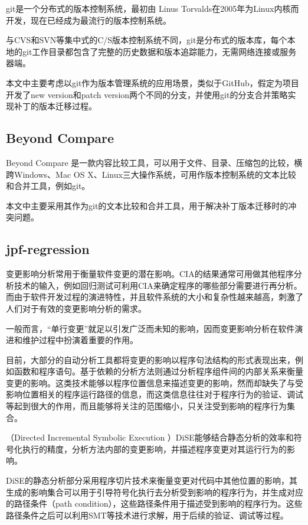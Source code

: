 git是一个分布式的版本控制系统，最初由 Linus Torvalds在2005年为Linux内核而开发，现在已经成为最流行的版本控制系统。

与CVS和SVN等集中式的C/S版本控制系统不同，git是分布式的版本库，每个本地的git工作目录都包含了完整的历史数据和版本追踪能力，无需网络连接或服务器端。
      

本文中主要考虑以git作为版本管理系统的应用场景，类似于GitHub，假定为项目开发了new version和patch version两个不同的分支，并使用git的分支合并策略实现补丁的版本迁移过程。
	\subsection{Beyond Compare}
		
Beyond Compare 是一款内容比较工具，可以用于文件、目录、压缩包的比较，横跨Windows、Mac OS X、Linux三大操作系统，可用作版本控制系统的文本比较和合并工具，例如git。
      
本文中主要采用其作为git的文本比较和合并工具，用于解决补丁版本迁移时的冲突问题。


	\subsection{jpf-regression} 
变更影响分析常用于衡量软件变更的潜在影响。CIA的结果通常可用做其他程序分析技术的输入，例如回归测试可利用CIA来确定程序的哪些部分需要进行再分析。而由于软件开发过程的演进特性，并且软件系统的大小和复杂性越来越高，刺激了人们对于有效的变更影响分析的需求。\cite{rungta2012change}

一般而言，“单行变更”就足以引发广泛而未知的影响，因而变更影响分析在软件演进和维护过程中扮演着重要的作用。

目前，大部分的自动分析工具都将变更的影响以程序句法结构的形式表现出来，例如函数和程序语句。基于依赖的分析方法则通过分析程序组件间的内部关系来衡量变更的影响。这类技术能够以程序位置信息来描述变更的影响，然而却缺失了与受影响位置相关的程序运行路径的信息，而这类信息往往对于程序行为的验证、调试等起到很大的作用，而且能够将关注的范围缩小，只关注受到影响的程序行为集合。

（Directed Incremental Symbolic Execution ）DiSE\cite{person2011directed,yang2014directed}能够结合静态分析的效率和符号化执行的精度，分析方法内部的变更影响，并描述程序变更对其运行行为的影响。

DiSE的静态分析部分采用程序切片技术来衡量变更对代码中其他位置的影响，其生成的影响集合可以用于引导符号化执行去分析受到影响的程序行为，并生成对应的路径条件（path condition），这些路径条件用于描述受到影响的程序行为。这些路径条件之后可以利用SMT等技术进行求解，用于后续的验证、调试等过程。

